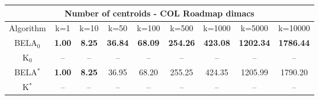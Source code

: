 \begin{tabular}{c|cccccccc}\toprule
\multicolumn{9}{c}{Number of centroids - COL Roadmap dimacs}\\ \midrule
Algorithm & k=1 & k=10 & k=50 & k=100 & k=500 & k=1000 & k=5000 & k=10000 \\ \midrule
BELA$_0$ & \textbf{1.00} & \textbf{8.25} & \textbf{36.84} & \textbf{68.09} & \textbf{254.26} & \textbf{423.08} & \textbf{1202.34} & \textbf{1786.44} \\
K$_0$ & -- & -- & -- & -- & -- & -- & -- & -- \\
BELA$^*$ & \textbf{1.00} & \textbf{8.25} & 36.95 & 68.20 & 255.25 & 424.35 & 1205.99 & 1790.20 \\
K$^*$ & -- & -- & -- & -- & -- & -- & -- & -- \\ \bottomrule 
\end{tabular}
